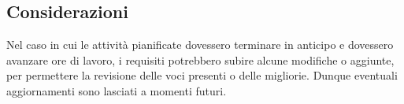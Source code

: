	

	\subsection{Considerazioni}
Nel caso in cui le attività pianificate dovessero terminare in anticipo e dovessero avanzare ore di lavoro, i requisiti potrebbero subire alcune modifiche o aggiunte, per permettere la revisione delle voci presenti o delle migliorie. Dunque eventuali aggiornamenti sono lasciati a momenti
futuri.


